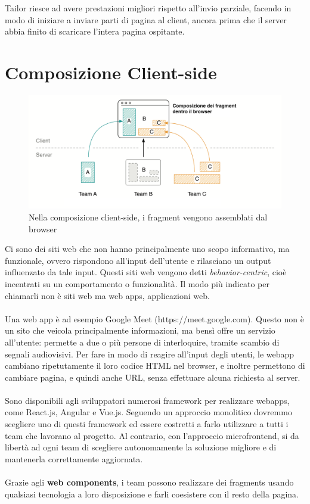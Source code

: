 Tailor riesce ad avere prestazioni migliori rispetto all'invio parziale, facendo in modo di iniziare a inviare parti di pagina al client,
ancora prima che il server abbia finito di scaricare l'intera pagina ospitante.

\pagebreak
\section{Composizione Client-side}
\begin{figure}[H]
    \centering
    \includegraphics[width=140mm]{img/clientside}
    \caption{Nella composizione client-side, i fragment vengono assemblati dal browser}
  \end{figure}
Ci sono dei siti web che non hanno principalmente uno scopo informativo, ma funzionale, ovvero rispondono all'input dell'utente
e rilasciano un output influenzato da tale input. Questi siti web vengono detti \emph{behavior-centric}, cioè 
incentrati su un comportamento o funzionalità.
Il modo più indicato per chiamarli non è siti web ma web apps, applicazioni web.
\\\\
Una web app è ad esempio Google Meet (https://meet.google.com).
Questo non è un sito che veicola principalmente informazioni, ma bensì offre un servizio all'utente: permette a due o più persone di 
interloquire, tramite scambio di segnali audiovisivi. Per fare in modo di reagire
all'input degli utenti, le webapp cambiano ripetutamente il loro codice HTML nel browser, e inoltre permettono 
di cambiare pagina, e quindi anche URL, senza effettuare alcuna richiesta al server.
\\\\
Sono disponibili agli sviluppatori numerosi framework per realizzare webapps, come React.js, Angular e Vue.js.
Seguendo un approccio monolitico dovremmo scegliere uno di questi framework ed essere costretti a farlo utilizzare
a tutti i team che lavorano al progetto. Al contrario, con l'approccio microfrontend, si da libertà ad ogni team
di scegliere autonomamente la soluzione migliore e di mantenerla correttamente aggiornata.
\\\\
Grazie agli \textbf{web components}, i team possono realizzare dei fragments usando qualsiasi tecnologia a loro disposizione e 
farli coesistere con il resto della pagina.



